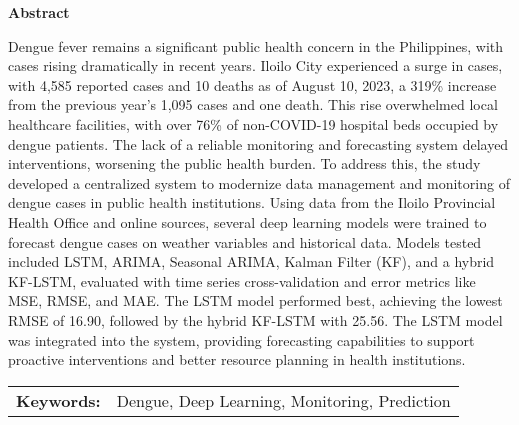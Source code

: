 
\begin{center}
	\textbf{Abstract}
\end{center}

{\small
	\begin{spacing}{1.5}  %
		Dengue fever remains a significant public health concern in the Philippines, with cases rising dramatically in recent years. Iloilo City experienced a surge in cases, with 4,585 reported cases and 10 deaths as of August 10, 2023, a 319\% increase from the previous year’s 1,095 cases and one death. This rise overwhelmed local healthcare facilities, with over 76\% of non-COVID-19 hospital beds occupied by dengue patients. The lack of a reliable monitoring and forecasting system delayed interventions, worsening the public health burden. To address this, the study developed a centralized system to modernize data management and monitoring of dengue cases in public health institutions. Using data from the Iloilo Provincial Health Office and online sources, several deep learning models were trained to forecast dengue cases on weather variables and historical data. Models tested included LSTM, ARIMA, Seasonal ARIMA, Kalman Filter (KF), and a hybrid KF-LSTM, evaluated with time series cross-validation and error metrics like MSE, RMSE, and MAE. The LSTM model performed best, achieving the lowest RMSE of 16.90, followed by the hybrid KF-LSTM with 25.56. The LSTM model was integrated into the system, providing forecasting capabilities to support proactive interventions and better resource planning in health institutions.
	\end{spacing}
}

\vspace{0.5em}
\begin{tabular}{lp{4.25in}}
	\hspace{-0.5em}\textbf{Keywords:}\hspace{0.25em} & Dengue, Deep Learning, Monitoring, Prediction \\
\end{tabular}

